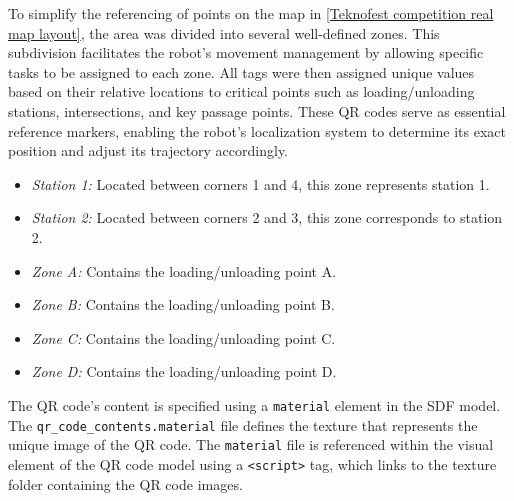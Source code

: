 \documentclass[../../main]{subfiles}
\begin{document}
To simplify the referencing of points on the map in \cref{Teknofest competition real map layout}, the area was divided into several
well-defined zones. This subdivision facilitates the robot's movement management by
allowing specific tasks to be assigned to each zone. All tags were then 
assigned unique values based on their relative locations to critical
points such as loading/unloading stations, intersections, and key passage points.
These QR codes serve as essential reference markers, enabling the robot’s localization
system to determine its exact position and adjust its trajectory accordingly.

\begin{itemize}
\item \emph{Station 1:} Located between corners 1 and 4, this zone represents station 1.
\item \emph{Station 2:} Located between corners 2 and 3, this zone corresponds to station 2.
\item \emph{Zone A:} Contains the loading/unloading point A.
\item \emph{Zone B:} Contains the loading/unloading point B.
\item \emph{Zone C:} Contains the loading/unloading point C.
\item \emph{Zone D:} Contains the loading/unloading point D.
\end{itemize}

The QR code's content is specified using a \texttt{material} element in the SDF model. 
The \texttt{qr\_code\_contents.material} file defines the texture that represents the unique 
image of the QR code. The \texttt{material} file is referenced within the visual element of the 
QR code model using a \texttt{<script>} tag, which links to the texture folder containing 
the QR code images.
\end{document}
